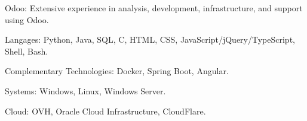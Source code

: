 \begin{indentsection}{\parindent}
  \begin{description*}
    \item[Odoo:] Extensive experience in analysis, development, infrastructure, and support using Odoo.
    \item[Langages:] Python, Java, SQL, C, HTML, CSS, JavaScript/jQuery/TypeScript, Shell, Bash.
    \item[Complementary Technologies:] Docker, Spring Boot, Angular.
    \item[Systems:] Windows, Linux, Windows Server.
    \item[Cloud:] OVH, Oracle Cloud Infrastructure, CloudFlare.

  \end{description*}
\end{indentsection}
